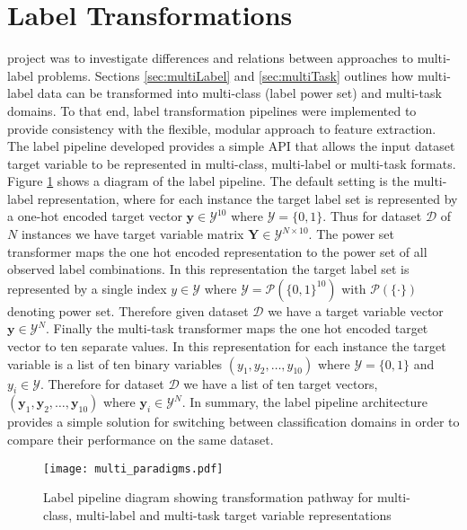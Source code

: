 \documentclass[Dissertation.tex]{subfiles}
\begin{document}
\section{Label Transformations}
project was to investigate differences and relations between approaches to multi-label problems. Sections \ref{sec:multiLabel} and \ref{sec:multiTask} outlines how multi-label data can be transformed into multi-class (label power set) and multi-task domains. To that end, label transformation pipelines were implemented to provide consistency with the flexible, modular approach to feature extraction. The label pipeline developed provides a simple API that allows the input dataset target variable to be represented in multi-class, multi-label or multi-task formats. Figure \ref{fig:labelPipe} shows a diagram of the label pipeline. The default setting is the multi-label representation, where for each instance the target label set is represented by a one-hot encoded target vector $\mathbf{y} \in \mathcal{Y}^{10}$ where $ \mathcal{Y} = \{0,1\} $. Thus for dataset $ \mathcal{D} $ of $ N $ instances we have target variable matrix $ \mathbf{Y} \in \mathcal{Y}^{N\times10}$. The power set transformer maps the one hot encoded representation to the power set of all observed label combinations. In this representation the target label set is represented by a single index $ y \in \mathcal{Y} $ where $\mathcal{Y} = \mathcal{P}(\{0,1\}^{10})  $ with $\mathcal{P}(\{\cdot\})$ denoting power set. Therefore given dataset $ \mathcal{D} $ we have a target variable vector $ \mathbf{y} \in \mathcal{Y}^N$. Finally the multi-task transformer maps the one hot encoded  target vector to ten separate values. In this representation for each instance the target variable is a list of ten binary variables $ (y_1, y_2, \dots,y_{10} ) $ where $ \mathcal{Y} = \{0,1\} $ and $ y_i \in \mathcal{Y}$. Therefore for dataset $\mathcal{D}$ we have a list of ten target vectors, $ (\mathbf{y}_1,\mathbf{y}_2, \dots, \mathbf{y}_{10}) $ where $ \mathbf{y}_i \in \mathcal{Y}^N $. In summary, the label pipeline architecture provides a simple solution for switching between classification domains in order to compare their performance on the same dataset.
	
\begin{figure}

	\texttt{[image: multi\_paradigms.pdf]}
	\caption{Label pipeline diagram showing transformation pathway for multi-class, multi-label and multi-task target variable representations}
	\label{fig:labelPipe}
\end{figure}
\end{document}
